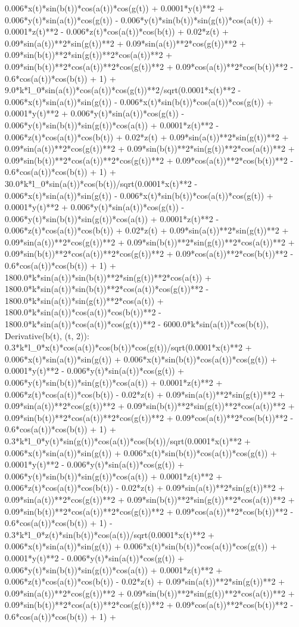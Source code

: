 0.006*x(t)*sin(b(t))*cos(a(t))*cos(g(t)) + 0.0001*y(t)**2 + 0.006*y(t)*sin(a(t))*cos(g(t)) - 0.006*y(t)*sin(b(t))*sin(g(t))*cos(a(t)) + 0.0001*z(t)**2 - 0.006*z(t)*cos(a(t))*cos(b(t)) + 0.02*z(t) + 0.09*sin(a(t))**2*sin(g(t))**2 + 0.09*sin(a(t))**2*cos(g(t))**2 + 0.09*sin(b(t))**2*sin(g(t))**2*cos(a(t))**2 + 0.09*sin(b(t))**2*cos(a(t))**2*cos(g(t))**2 + 0.09*cos(a(t))**2*cos(b(t))**2 - 0.6*cos(a(t))*cos(b(t)) + 1) + 9.0*k*l_0*sin(a(t))*cos(a(t))*cos(g(t))**2/sqrt(0.0001*x(t)**2 - 0.006*x(t)*sin(a(t))*sin(g(t)) - 0.006*x(t)*sin(b(t))*cos(a(t))*cos(g(t)) + 0.0001*y(t)**2 + 0.006*y(t)*sin(a(t))*cos(g(t)) - 0.006*y(t)*sin(b(t))*sin(g(t))*cos(a(t)) + 0.0001*z(t)**2 - 0.006*z(t)*cos(a(t))*cos(b(t)) + 0.02*z(t) + 0.09*sin(a(t))**2*sin(g(t))**2 + 0.09*sin(a(t))**2*cos(g(t))**2 + 0.09*sin(b(t))**2*sin(g(t))**2*cos(a(t))**2 + 0.09*sin(b(t))**2*cos(a(t))**2*cos(g(t))**2 + 0.09*cos(a(t))**2*cos(b(t))**2 - 0.6*cos(a(t))*cos(b(t)) + 1) + 30.0*k*l_0*sin(a(t))*cos(b(t))/sqrt(0.0001*x(t)**2 - 0.006*x(t)*sin(a(t))*sin(g(t)) - 0.006*x(t)*sin(b(t))*cos(a(t))*cos(g(t)) + 0.0001*y(t)**2 + 0.006*y(t)*sin(a(t))*cos(g(t)) - 0.006*y(t)*sin(b(t))*sin(g(t))*cos(a(t)) + 0.0001*z(t)**2 - 0.006*z(t)*cos(a(t))*cos(b(t)) + 0.02*z(t) + 0.09*sin(a(t))**2*sin(g(t))**2 + 0.09*sin(a(t))**2*cos(g(t))**2 + 0.09*sin(b(t))**2*sin(g(t))**2*cos(a(t))**2 + 0.09*sin(b(t))**2*cos(a(t))**2*cos(g(t))**2 + 0.09*cos(a(t))**2*cos(b(t))**2 - 0.6*cos(a(t))*cos(b(t)) + 1) + 1800.0*k*sin(a(t))*sin(b(t))**2*sin(g(t))**2*cos(a(t)) + 1800.0*k*sin(a(t))*sin(b(t))**2*cos(a(t))*cos(g(t))**2 - 1800.0*k*sin(a(t))*sin(g(t))**2*cos(a(t)) + 1800.0*k*sin(a(t))*cos(a(t))*cos(b(t))**2 - 1800.0*k*sin(a(t))*cos(a(t))*cos(g(t))**2 - 6000.0*k*sin(a(t))*cos(b(t)), Derivative(b(t), (t, 2)): 0.3*k*l_0*x(t)*cos(a(t))*cos(b(t))*cos(g(t))/sqrt(0.0001*x(t)**2 + 0.006*x(t)*sin(a(t))*sin(g(t)) + 0.006*x(t)*sin(b(t))*cos(a(t))*cos(g(t)) + 0.0001*y(t)**2 - 0.006*y(t)*sin(a(t))*cos(g(t)) + 0.006*y(t)*sin(b(t))*sin(g(t))*cos(a(t)) + 0.0001*z(t)**2 + 0.006*z(t)*cos(a(t))*cos(b(t)) - 0.02*z(t) + 0.09*sin(a(t))**2*sin(g(t))**2 + 0.09*sin(a(t))**2*cos(g(t))**2 + 0.09*sin(b(t))**2*sin(g(t))**2*cos(a(t))**2 + 0.09*sin(b(t))**2*cos(a(t))**2*cos(g(t))**2 + 0.09*cos(a(t))**2*cos(b(t))**2 - 0.6*cos(a(t))*cos(b(t)) + 1) + 0.3*k*l_0*y(t)*sin(g(t))*cos(a(t))*cos(b(t))/sqrt(0.0001*x(t)**2 + 0.006*x(t)*sin(a(t))*sin(g(t)) + 0.006*x(t)*sin(b(t))*cos(a(t))*cos(g(t)) + 0.0001*y(t)**2 - 0.006*y(t)*sin(a(t))*cos(g(t)) + 0.006*y(t)*sin(b(t))*sin(g(t))*cos(a(t)) + 0.0001*z(t)**2 + 0.006*z(t)*cos(a(t))*cos(b(t)) - 0.02*z(t) + 0.09*sin(a(t))**2*sin(g(t))**2 + 0.09*sin(a(t))**2*cos(g(t))**2 + 0.09*sin(b(t))**2*sin(g(t))**2*cos(a(t))**2 + 0.09*sin(b(t))**2*cos(a(t))**2*cos(g(t))**2 + 0.09*cos(a(t))**2*cos(b(t))**2 - 0.6*cos(a(t))*cos(b(t)) + 1) - 0.3*k*l_0*z(t)*sin(b(t))*cos(a(t))/sqrt(0.0001*x(t)**2 + 0.006*x(t)*sin(a(t))*sin(g(t)) + 0.006*x(t)*sin(b(t))*cos(a(t))*cos(g(t)) + 0.0001*y(t)**2 - 0.006*y(t)*sin(a(t))*cos(g(t)) + 0.006*y(t)*sin(b(t))*sin(g(t))*cos(a(t)) + 0.0001*z(t)**2 + 0.006*z(t)*cos(a(t))*cos(b(t)) - 0.02*z(t) + 0.09*sin(a(t))**2*sin(g(t))**2 + 0.09*sin(a(t))**2*cos(g(t))**2 + 0.09*sin(b(t))**2*sin(g(t))**2*cos(a(t))**2 + 0.09*sin(b(t))**2*cos(a(t))**2*cos(g(t))**2 + 0.09*cos(a(t))**2*cos(b(t))**2 - 0.6*cos(a(t))*cos(b(t)) + 1) + 